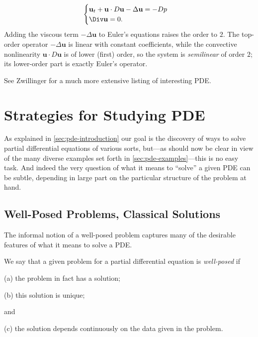 \begin{example}
\label{ex:navier-stokes-equations-incompressible-viscous}
\leanok
$$\begin{cases}
\mathbf{u}_t + \mathbf{u} \cdot D\mathbf{u} - \Delta\mathbf{u} = -D p \\
\Div \mathbf{u} = 0.
\end{cases}$$
Adding the viscous term $-\Delta\mathbf{u}$ to Euler's equations raises the order to $2$. The top-order operator $-\Delta\mathbf{u}$ is linear with constant coefficients, while the convective nonlinearity $\mathbf{u}\cdot D\mathbf{u}$ is of lower (first) order, so the system is \emph{semilinear} of order $2$; its lower-order part is exactly Euler's operator.
\end{example}

See Zwillinger \cite{Zwillinger1984} for a much more extensive listing of interesting PDE.

\section{Strategies for Studying PDE}
\label{sec:strategies-studying-pde}

As explained in \cref{sec:pde-introduction} our goal is the discovery of ways to solve partial differential equations of various sorts, but---as should now be clear in view of the many diverse examples set forth in \cref{sec:pde-examples}---this is no easy task. And indeed the very question of what it means to ``solve'' a given PDE can be subtle, depending in large part on the particular structure of the problem at hand.

\subsection{Well-Posed Problems, Classical Solutions}
\label{sec:well-posed-classical-solutions}

The informal notion of a well-posed problem captures many of the desirable features of what it means to solve a PDE.

\begin{definition}
\label{def:well-posed-problem}
\leanok
We say that a given problem for a partial differential equation is \textit{well-posed} if

(a) the problem in fact has a solution;

(b) this solution is unique;

and

(c) the solution depends continuously on the data given in the problem.
\end{definition}

